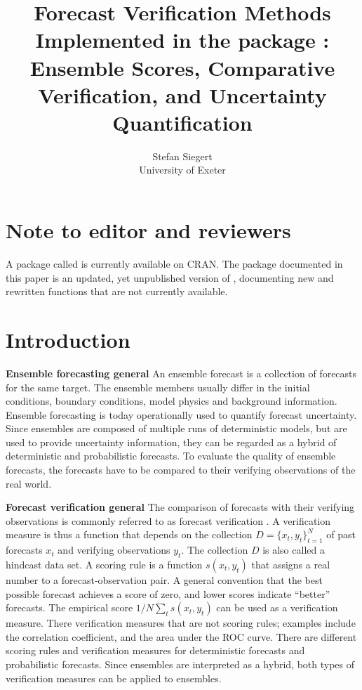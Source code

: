 \documentclass[article]{jss}\usepackage{graphicx, color}
\author{Stefan Siegert\\University of Exeter}
\title{Forecast Verification Methods Implemented in the \proglang{R} package \pkg{SpecsVerification}: Ensemble Scores, Comparative Verification, and Uncertainty Quantification}
\begin{document}

\section*{Note to editor and reviewers}

A package called  is currently available on CRAN.
The package documented in this paper is an updated, yet unpublished version of , documenting new and rewritten functions that are not currently available.



\section{Introduction}

{\bf Ensemble forecasting general}
An ensemble forecast is a collection of forecasts for the same target.
The ensemble members usually differ in the initial conditions, boundary conditions, model physics and background information.
Ensemble forecasting is today operationally used to quantify forecast uncertainty.
Since ensembles are composed of multiple runs of deterministic models, but are used to provide uncertainty information, they can be regarded as a hybrid of deterministic and probabilistic forecasts.
To evaluate the quality of ensemble forecasts, the forecasts have to be compared to their verifying observations of the real world.



{\bf Forecast verification general}
The comparison of forecasts with their verifying observations is commonly referred to as forecast verification \citep{jolliffe2012forecast}.
A verification measure is thus a function that depends on the collection $D=\{x_t, y_t\}_{t=1}^N$ of past forecasts $x_t$ and verifying observations $y_t$.
The collection $D$ is also called a hindcast data set.
A scoring rule is a function $s(x_t, y_t)$ that assigns a real number to a forecast-observation pair.
A general convention that the best possible forecast achieves a score of zero, and lower scores indicate ``better'' forecasts.
The empirical score $1/N \sum_t s(x_t, y_t)$ can be used as a verification measure.
There verification measures that are not scoring rules; examples include the correlation coefficient, and the area under the ROC curve.
There are different scoring rules and verification measures for deterministic forecasts and probabilistic forecasts.
Since ensembles are interpreted as a hybrid, both types of verification measures can be applied to ensembles.
\end{document}
